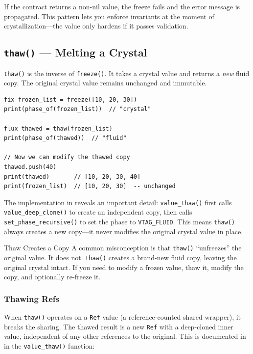 If the contract returns a non-nil value, the freeze fails and the error message is propagated.
This pattern lets you enforce invariants at the moment of crystallization---the value only hardens if it passes validation.

\subsection{\texttt{thaw()} --- Melting a Crystal}\label{subsec:thaw}

\lstinline|thaw()| is the inverse of \lstinline|freeze()|.
It takes a crystal value and returns a \emph{new} fluid copy.
The original crystal value remains unchanged and immutable.

\begin{lstlisting}[language=Lattice, caption={The \texttt{thaw()} function}]
fix frozen_list = freeze([10, 20, 30])
print(phase_of(frozen_list))  // "crystal"

flux thawed = thaw(frozen_list)
print(phase_of(thawed))  // "fluid"

// Now we can modify the thawed copy
thawed.push(40)
print(thawed)       // [10, 20, 30, 40]
print(frozen_list)  // [10, 20, 30]  -- unchanged
\end{lstlisting}

The implementation in  reveals an important detail: \lstinline|value_thaw()| first calls \lstinline|value_deep_clone()| to create an independent copy, then calls \lstinline|set_phase_recursive()| to set the phase to \lstinline|VTAG_FLUID|.
This means \lstinline|thaw()| always creates a new copy---it never modifies the original crystal value in place.

\begin{warnbox}{Thaw Creates a Copy}
A common misconception is that \lstinline|thaw()| ``unfreezes'' the original value.
It does not.
\lstinline|thaw()| creates a brand-new fluid copy, leaving the original crystal intact.
If you need to modify a frozen value, thaw it, modify the copy, and optionally re-freeze it.
\end{warnbox}

\subsubsection{Thawing Refs}

When \lstinline|thaw()| operates on a \lstinline|Ref| value (a reference-counted shared wrapper), it breaks the sharing.
The thawed result is a new \lstinline|Ref| with a deep-cloned inner value, independent of any other references to the original.
This is documented in  in the \lstinline|value_thaw()| function:

